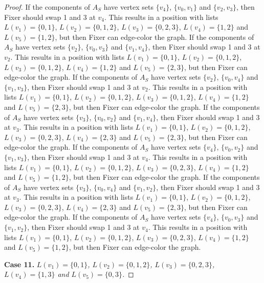 \documentclass[12pt]{amsart}
\theoremstyle{plain}
\theoremstyle{definition}
\theoremstyle{remark}
\begin{document}
\begin{proof}
If the components of $A_S$ have vertex sets $\{v_4\}$, $\{v_0, v_1\}$ and $\{v_2, v_3\}$, then Fixer should swap 1 and 3 at $v_4$. This results in a position with lists $L(v_1) = \{0, 1\}$, $L(v_2) = \{0, 1, 2\}$, $L(v_3) = \{0, 2, 3\}$, $L(v_4) = \{1, 2\}$ and $L(v_5) = \{1, 2\}$, but then Fixer can edge-color the graph.
If the components of $A_S$ have vertex sets $\{v_2\}$, $\{v_0, v_3\}$ and $\{v_1, v_4\}$, then Fixer should swap 1 and 3 at $v_2$. This results in a position with lists $L(v_1) = \{0, 1\}$, $L(v_2) = \{0, 1, 2\}$, $L(v_3) = \{0, 1, 2\}$, $L(v_4) = \{1, 2\}$ and $L(v_5) = \{2, 3\}$, but then Fixer can edge-color the graph.
If the components of $A_S$ have vertex sets $\{v_2\}$, $\{v_0, v_4\}$ and $\{v_1, v_3\}$, then Fixer should swap 1 and 3 at $v_2$. This results in a position with lists $L(v_1) = \{0, 1\}$, $L(v_2) = \{0, 1, 2\}$, $L(v_3) = \{0, 1, 2\}$, $L(v_4) = \{1, 2\}$ and $L(v_5) = \{2, 3\}$, but then Fixer can edge-color the graph.
If the components of $A_S$ have vertex sets $\{v_3\}$, $\{v_0, v_2\}$ and $\{v_1, v_4\}$, then Fixer should swap 1 and 3 at $v_3$. This results in a position with lists $L(v_1) = \{0, 1\}$, $L(v_2) = \{0, 1, 2\}$, $L(v_3) = \{0, 2, 3\}$, $L(v_4) = \{2, 3\}$ and $L(v_5) = \{2, 3\}$, but then Fixer can edge-color the graph.
If the components of $A_S$ have vertex sets $\{v_4\}$, $\{v_0, v_2\}$ and $\{v_1, v_3\}$, then Fixer should swap 1 and 3 at $v_4$. This results in a position with lists $L(v_1) = \{0, 1\}$, $L(v_2) = \{0, 1, 2\}$, $L(v_3) = \{0, 2, 3\}$, $L(v_4) = \{1, 2\}$ and $L(v_5) = \{1, 2\}$, but then Fixer can edge-color the graph.
If the components of $A_S$ have vertex sets $\{v_3\}$, $\{v_0, v_4\}$ and $\{v_1, v_2\}$, then Fixer should swap 1 and 3 at $v_3$. This results in a position with lists $L(v_1) = \{0, 1\}$, $L(v_2) = \{0, 1, 2\}$, $L(v_3) = \{0, 2, 3\}$, $L(v_4) = \{2, 3\}$ and $L(v_5) = \{2, 3\}$, but then Fixer can edge-color the graph.
If the components of $A_S$ have vertex sets $\{v_4\}$, $\{v_0, v_3\}$ and $\{v_1, v_2\}$, then Fixer should swap 1 and 3 at $v_4$. This results in a position with lists $L(v_1) = \{0, 1\}$, $L(v_2) = \{0, 1, 2\}$, $L(v_3) = \{0, 2, 3\}$, $L(v_4) = \{1, 2\}$ and $L(v_5) = \{1, 2\}$, but then Fixer can edge-color the graph.

\noindent\textbf{Case 11.  }\textit{$L(v_1) = \{0, 1\}$, $L(v_2) = \{0, 1, 2\}$, $L(v_3) = \{0, 2, 3\}$, $L(v_4) = \{1, 3\}$ and $L(v_5) = \{0, 3\}$.}


\end{proof}
\end{document}
